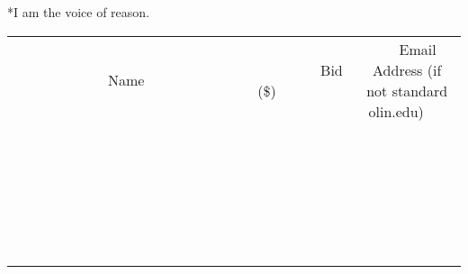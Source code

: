 \documentclass[11pt]{article}
\begin{document}
*I am the voice of reason.
\\[6ex]
\begin{tabular}{c c c}
~~~~~~~~~~~~~Name~~~~~~~~~~~~~ & ~~~~~~~~~Bid (\$)~~~~~~~~~  & ~~~Email Address (if not standard olin.edu)~~~\\
 & & \\
\hline
 & & \\
\hline
 & & \\
\hline
 & & \\
\hline
 & & \\
\hline
 & & \\
\hline
 & & \\
\hline
 & & \\
\hline
 & & \\
\hline
 & & \\
\hline
 & & \\
\hline
 & & \\
\hline
 & & \\
\hline
 & & \\
\hline
 & & \\
\hline
 & & \\
\hline
 & & \\
\hline
 & & \\
\hline
 & & \\
\hline
 & & \\
\hline
 & & \\
\hline
 & & \\
\hline
 & & \\
\hline
 & & \\
\hline
 & & \\
\hline
 & & \\
\hline
\end{tabular}
\newpage
\end{document}
